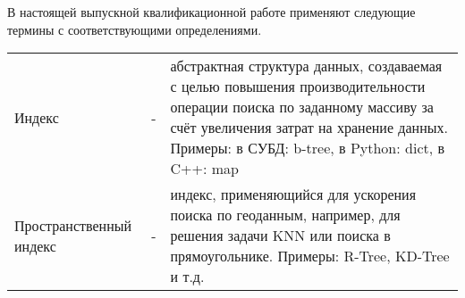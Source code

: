 

В настоящей выпускной квалификационной работе применяют следующие термины с соответствующими определениями.

\vspace{1em}

\noindent
\begin{tabularx}{\textwidth}{m{4cm} m{0.5cm} X}
Индекс & - & абстрактная структура данных, создаваемая с целью повышения производительности операции поиска по заданному массиву за счёт увеличения затрат на хранение данных. Примеры: в СУБД: b-tree, в Python: dict, в C++: map \\
Пространственный индекс & - & индекс, применяющийся для ускорения поиска по геоданным, например, для решения задачи KNN или поиска в прямоугольнике. Примеры: R-Tree, KD-Tree и т.д. \\
\end{tabularx}

